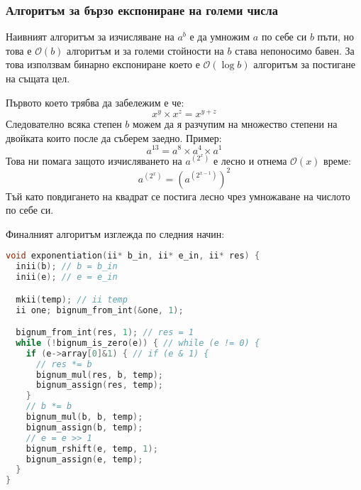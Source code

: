 \subsubsection{Алгоритъм за бързо експониране на големи числа}
Наивният алгоритъм за изчисляване на $a^b$ е да умножим $a$ по себе си $b$ пъти, но това е $\mathcal{O}(b)$ алгоритъм и за големи стойности на $b$ става непоносимо бавен. За това използвам бинарно експониране което е $\mathcal{O}(\log b)$ алгоритъм за постигане на същата цел.

Първото което трябва да забележим е че:
$$ x^y \times x^z = x^{y+z} $$
Следователно всяка степен $b$ можем да я разчупим на множество степени на двойката които после да съберем заедно. Пример:
$$ a^{13} = a^8 \times a^4 \times a^1 $$
Това ни помага защото изчисляването на $a^{(2^x)}$ е лесно и отнема $\mathcal{O}(x)$ време:
$$ a^{(2^x)} = (a^{(2^{x-1})})^2$$
Тъй като повдигането на квадрат се постига лесно чрез умножаване на числото по себе си.

Финалният алгоритъм изглежда по следния начин:
\begin{lstlisting}[language=C]
void exponentiation(ii* b_in, ii* e_in, ii* res) {
  inii(b); // b = b_in
  inii(e); // e = e_in

  mkii(temp); // ii temp
  ii one; bignum_from_int(&one, 1);

  bignum_from_int(res, 1); // res = 1
  while (!bignum_is_zero(e)) { // while (e != 0) {
    if (e->array[0]&1) { // if (e & 1) {
      // res *= b
      bignum_mul(res, b, temp);
      bignum_assign(res, temp);
    }
    // b *= b
    bignum_mul(b, b, temp);
    bignum_assign(b, temp);
    // e = e >> 1
    bignum_rshift(e, temp, 1);
    bignum_assign(e, temp);
  }
}
\end{lstlisting}
